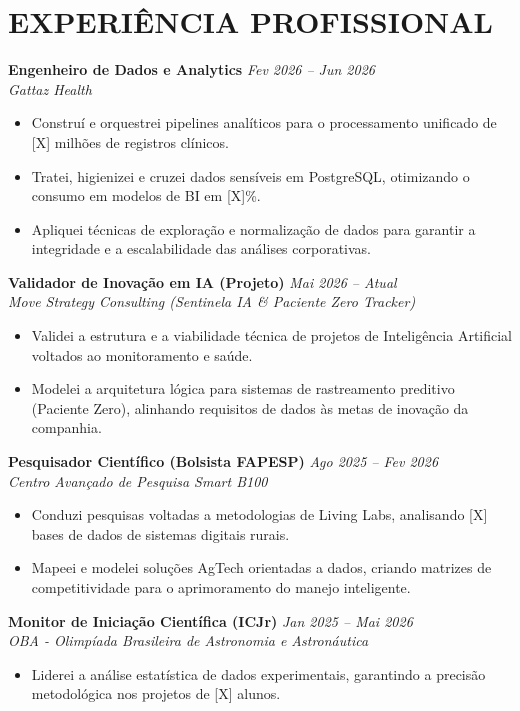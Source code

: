 \documentclass[11pt,a4paper]{article}
\begin{document}
\section*{EXPERIÊNCIA PROFISSIONAL}
\textbf{Engenheiro de Dados e Analytics} \hfill \textit{Fev 2026 -- Jun 2026} \\
\textit{Gattaz Health} \\
\begin{itemize}
    \item Construí e orquestrei pipelines analíticos para o processamento unificado de [X] milhões de registros clínicos.
    \item Tratei, higienizei e cruzei dados sensíveis em PostgreSQL, otimizando o consumo em modelos de BI em [X]\%.
    \item Apliquei técnicas de exploração e normalização de dados para garantir a integridade e a escalabilidade das análises corporativas.
\end{itemize}

\textbf{Validador de Inovação em IA (Projeto)} \hfill \textit{Mai 2026 -- Atual} \\
\textit{Move Strategy Consulting (Sentinela IA \& Paciente Zero Tracker)} \\
\begin{itemize}
    \item Validei a estrutura e a viabilidade técnica de projetos de Inteligência Artificial voltados ao monitoramento e saúde.
    \item Modelei a arquitetura lógica para sistemas de rastreamento preditivo (Paciente Zero), alinhando requisitos de dados às metas de inovação da companhia.
\end{itemize}

\vspace{0.2cm}
\textbf{Pesquisador Científico (Bolsista FAPESP)} \hfill \textit{Ago 2025 -- Fev 2026} \\
\textit{Centro Avançado de Pesquisa Smart B100} \\
\begin{itemize}
    \item Conduzi pesquisas voltadas a metodologias de Living Labs, analisando [X] bases de dados de sistemas digitais rurais.
    \item Mapeei e modelei soluções AgTech orientadas a dados, criando matrizes de competitividade para o aprimoramento do manejo inteligente.
\end{itemize}

\vspace{0.2cm}
\textbf{Monitor de Iniciação Científica (ICJr)} \hfill \textit{Jan 2025 -- Mai 2026} \\
\textit{OBA - Olimpíada Brasileira de Astronomia e Astronáutica} \\
\begin{itemize}
    \item Liderei a análise estatística de dados experimentais, garantindo a precisão metodológica nos projetos de [X] alunos.
\end{itemize}
\end{document}
